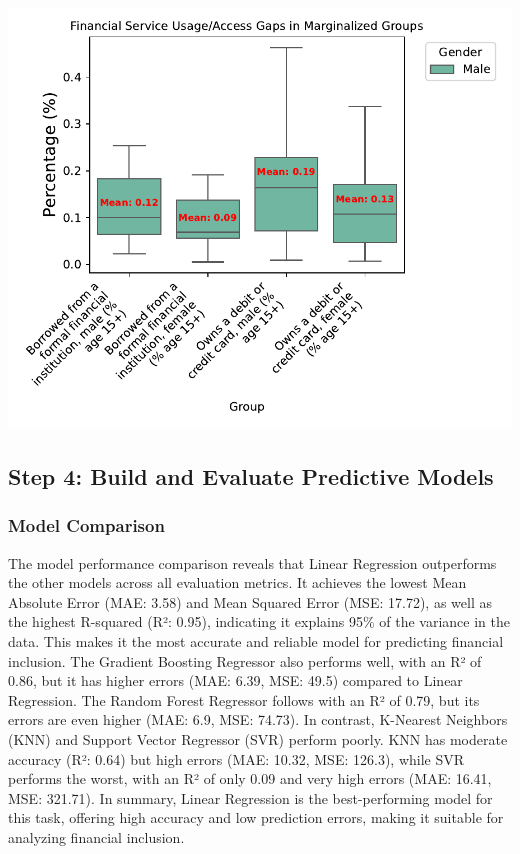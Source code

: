 \documentclass[preprint, 3p,
authoryear]{elsarticle} %
\begin{document}
\begin{center}\includegraphics[width=0.9\linewidth]{Final-Report_files/figure-latex/unnamed-chunk-24-19} \end{center}

\subsection{Step 4: Build and Evaluate Predictive
Models}\label{step-4-build-and-evaluate-predictive-models}

\subsubsection{Model Comparison}\label{model-comparison}

The model performance comparison reveals that Linear Regression
outperforms the other models across all evaluation metrics. It achieves
the lowest Mean Absolute Error (MAE: 3.58) and Mean Squared Error (MSE:
17.72), as well as the highest R-squared (R²: 0.95), indicating it
explains 95\% of the variance in the data. This makes it the most
accurate and reliable model for predicting financial inclusion. The
Gradient Boosting Regressor also performs well, with an R² of 0.86, but
it has higher errors (MAE: 6.39, MSE: 49.5) compared to Linear
Regression. The Random Forest Regressor follows with an R² of 0.79, but
its errors are even higher (MAE: 6.9, MSE: 74.73). In contrast,
K-Nearest Neighbors (KNN) and Support Vector Regressor (SVR) perform
poorly. KNN has moderate accuracy (R²: 0.64) but high errors (MAE:
10.32, MSE: 126.3), while SVR performs the worst, with an R² of only
0.09 and very high errors (MAE: 16.41, MSE: 321.71). In summary, Linear
Regression is the best-performing model for this task, offering high
accuracy and low prediction errors, making it suitable for analyzing
financial inclusion.
\end{document}
